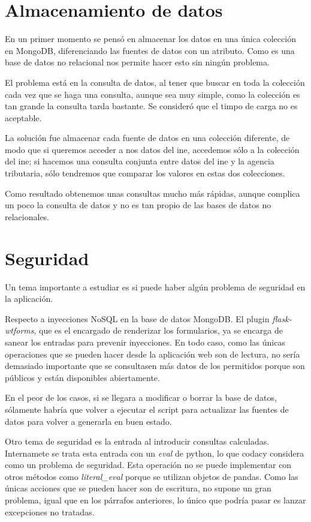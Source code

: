 \section{Almacenamiento de datos}

En un primer momento se pensó en almacenar los datos en una única colección en MongoDB, diferenciando las fuentes de datos con un atributo. Como es una base de datos no relacional nos permite hacer esto sin ningún problema.

El problema está en la consulta de datos, al tener que buscar en toda la colección cada vez que se haga una consulta, aunque sea muy simple, como la colección es tan grande la consulta tarda bastante. Se consideró que el timpo de carga no es aceptable.

La solución fue almacenar cada fuente de datos en una colección diferente, de modo que si queremos acceder a nos datos del ine, accedemos sólo a la colección del ine; si hacemos una consulta conjunta entre datos del ine y la agencia tributaria, sólo tendremos que comparar los valores en estas dos colecciones.

Como resultado obtenemos unas consultas mucho más rápidas, aunque complica un poco la consulta de datos y no es tan propio de las bases de datos no relacionales.

\section{Seguridad}

Un tema importante a estudiar es si puede haber algún problema de seguridad en la aplicación.

Respecto a inyecciones NoSQL en la base de datos MongoDB. El plugin \textit{flask-wtforms}, que es el encargado de renderizar los formularios, ya se encarga de sanear los entradas para prevenir inyecciones. En todo caso, como las únicas operaciones que se pueden hacer desde la aplicación web son de lectura, no sería demasiado importante que se consultasen más datos de los permitidos porque son públicos y están disponibles abiertamente.

En el peor de los casos, si se llegara a modificar o borrar la base de datos, sólamente habría que volver a ejecutar el script para actualizar las fuentes de datos para volver a generarla en buen estado.

Otro tema de seguridad es la entrada al introducir consultas calculadas. Internamete se trata esta entrada con un \textit{eval} de python, lo que codacy considera como un problema de seguridad. Esta operación no se puede implementar con otros métodos como \textit{literal\_eval} porque se utilizan objetos de pandas. Como las únicas acciones que se pueden hacer son de escritura, no supone un gran problema, igual que en los párrafos anteriores, lo único que podría pasar es lanzar excepciones no tratadas.
